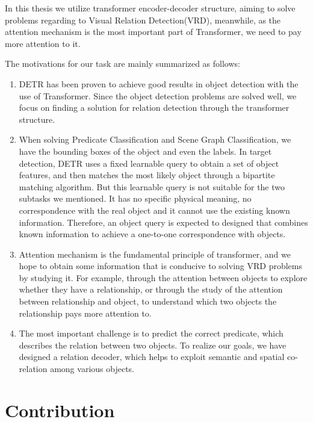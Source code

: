 In this thesis we utilize transformer encoder-decoder structure, aiming to solve problems regarding to Visual Relation Detection(VRD), meanwhile, as the attention mechanism is the most important part of Transformer, we need to pay more attention to it.

The motivations for our task are mainly summarized as follows:

\begin{enumerate}[\qquad 1.]
	\item DETR has been proven to achieve good results in object detection with the use of Transformer. Since the object detection problems are solved well, we focus on finding a solution for relation detection through the transformer structure.
	\item When solving Predicate Classification and Scene Graph Classification, we have the bounding boxes of the object and even the labels. In target detection, DETR uses a fixed learnable query to obtain a set of object features, and then matches the most likely object through a bipartite matching algorithm. But this learnable query is not suitable for the two subtasks we mentioned. It has no specific physical meaning, no correspondence with the real object and it cannot use the existing known information. Therefore, an object query is expected to designed that combines known information to achieve a one-to-one correspondence with objects.
	\item Attention mechanism is the fundamental principle of transformer, and we hope to obtain some information that is conducive to solving VRD problems by studying it. For example, through the attention between objects to explore whether they have a relationship, or through the study of the attention between relationship and object, to understand which two objects the relationship pays more attention to.
	\item The most important challenge is to predict the correct predicate, which describes the relation between two objects. To realize our goals, we have designed a relation decoder, which helps to exploit semantic and spatial co-relation among various objects.
\end{enumerate}
 
 
\section{Contribution}

